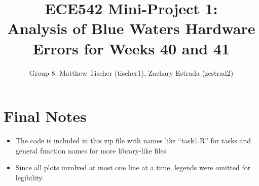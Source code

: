 \documentclass[notitlepage,groupedaddress]{IEEEtran}
\begin{document}
\title{ECE542 Mini-Project 1:\\ Analysis of Blue Waters Hardware Errors for
Weeks 40 and 41}
\author{Group 8: Matthew Tischer (tischer1), Zachary Estrada (zestrad2)}

\maketitle









\section{Final Notes}
\begin{itemize}
  \item The code is included in this zip file with names like ``task1.R'' for
  tasks and general function names for more library-like files
  \item Since all plots involved at most one line at a time, legends were
  omitted for legibility.
\end{itemize}





\end{document}
